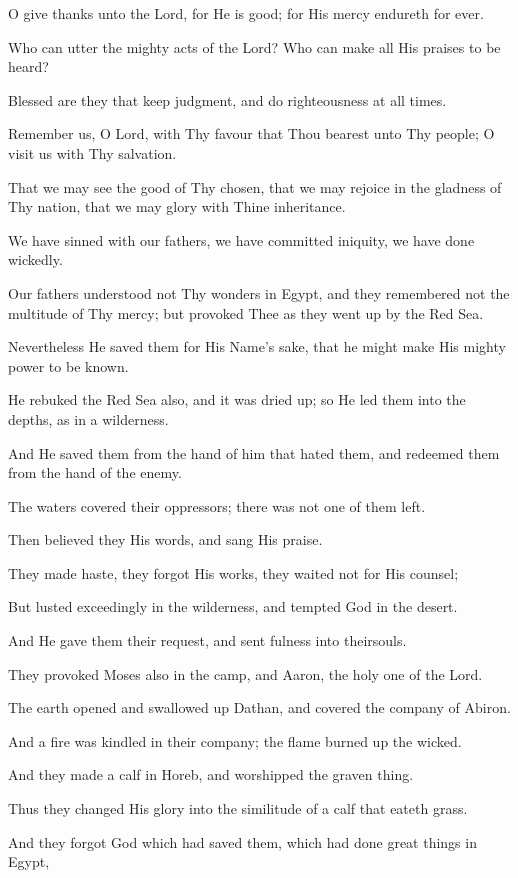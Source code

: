 O give thanks unto the Lord, for He is good; for His mercy endureth for ever.

Who can utter the mighty acts of the Lord? Who can make all His praises to be heard?

Blessed are they that keep judgment, and do righteousness at all times.

Remember us, O Lord, with Thy favour that Thou bearest unto Thy people; O visit us with Thy salvation.

That we may see the good of Thy chosen, that we may rejoice in the gladness of Thy nation, that we may glory with Thine inheritance.

We have sinned with our fathers, we have committed iniquity, we have done wickedly.

Our fathers understood not Thy wonders in Egypt, and they remembered not the multitude of Thy mercy; but provoked Thee as they went up by the Red Sea.

Nevertheless He saved them for His Name's sake, that he might make His mighty power to be known.

He rebuked the Red Sea also, and it was dried up; so He led them into the depths, as in a wilderness.

And He saved them from the hand of him that hated them, and redeemed them from the hand of the enemy.

The waters covered their oppressors; there was not one of them left.

Then believed they His words, and sang His praise.

They made haste, they forgot His works, they waited not for His counsel;

But lusted exceedingly in the wilderness, and tempted God in the desert.

And He gave them their request, and sent fulness into theirsouls.

They provoked Moses also in the camp, and Aaron, the holy one of the Lord.

The earth opened and swallowed up Dathan, and covered the company of Abiron.

And a fire was kindled in their company; the flame burned up the wicked.

And they made a calf in Horeb, and worshipped the graven thing.

Thus they changed His glory into the similitude of a calf that eateth grass.

And they forgot God which had saved them, which had done great things in Egypt,

